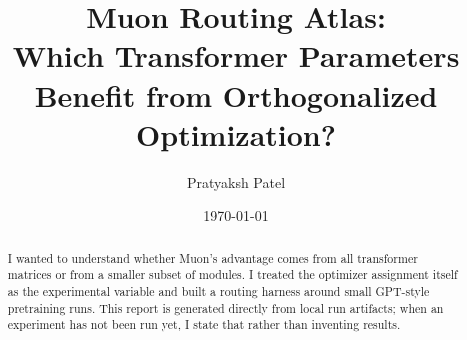 \documentclass[11pt]{article}
\title{\textbf{Muon Routing Atlas:}\\Which Transformer Parameters Benefit from Orthogonalized Optimization?}
\author{Pratyaksh Patel}
\date{\today}
\begin{document}
\maketitle

\begin{abstract}
I wanted to understand whether Muon's advantage comes from all transformer matrices or from a smaller subset of modules. I treated the optimizer assignment itself as the experimental variable and built a routing harness around small GPT-style pretraining runs. This report is generated directly from local run artifacts; when an experiment has not been run yet, I state that rather than inventing results.
\end{abstract}













\end{document}

